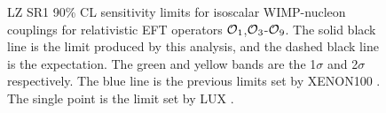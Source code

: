 \begin{figure}[!htbp]
\caption{LZ SR1 90\% CL sensitivity limits for isoscalar WIMP-nucleon couplings for relativistic EFT operators $\operatorname{\mathcal{O}}_1$,$\operatorname{\mathcal{O}}_3$-$\operatorname{\mathcal{O}}_9$.
         The solid black line is the limit produced by this analysis, and the dashed black line is the expectation. 
         The green and yellow bands are the 1$\sigma$ and 2$\sigma$ respectively.
         The blue line is the previous limits set by XENON100 \cite{xenon100_eft_ref}.
         The single point is the limit set by LUX \cite{LUX_RUN4_EFT_2021}. }
\label{fig:EFT_Result_SR1_Sensitivity_1}
\end{figure}


